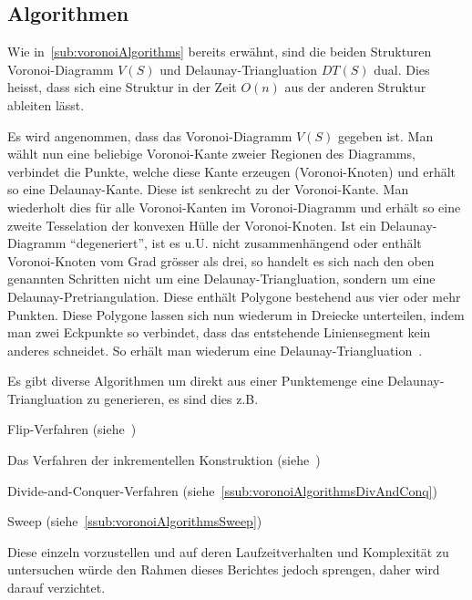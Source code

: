 \subsection{Algorithmen}
\label{sub:delaunayAlgorithms}
Wie in~\ref{sub:voronoiAlgorithms} bereits erwähnt, sind die beiden Strukturen Voronoi-Diagramm $V(S)$ und Delaunay-Triangluation $DT(S)$ dual. Dies heisst, dass sich eine Struktur in der Zeit $O(n)$ aus der anderen Struktur ableiten lässt.

Es wird angenommen, dass das Voronoi-Diagramm $V(S)$ gegeben ist. Man wählt nun eine beliebige Voronoi-Kante zweier Regionen des Diagramms, verbindet die Punkte, welche diese Kante erzeugen (Voronoi-Knoten) und erhält so eine Delaunay-Kante. Diese ist senkrecht zu der Voronoi-Kante. Man wiederholt dies für alle Voronoi-Kanten im Voronoi-Diagramm und erhält so eine zweite Tesselation der konvexen Hülle der Voronoi-Knoten.
Ist ein Delaunay-Diagramm ``degeneriert'', ist es u.U. nicht zusammenhängend oder enthält Voronoi-Knoten vom Grad grösser als drei, so handelt es sich nach den oben genannten Schritten nicht um eine Delaunay-Triangluation, sondern um eine Delaunay-Pretriangulation. Diese enthält Polygone bestehend aus vier oder mehr Punkten. Diese Polygone lassen sich nun wiederum in Dreiecke unterteilen, indem man zwei Eckpunkte so verbindet, dass das entstehende Liniensegment kein anderes schneidet. So erhält man wiederum eine Delaunay-Triangluation~\parencite[S. 52 bis 56]{atsuyuki2000spatialtessellations}.

Es gibt diverse Algorithmen um direkt aus einer Punktemenge eine Delaunay-Triangluation zu generieren, es sind dies z.B.

\begin{compactitem}
\item Flip-Verfahren (siehe~\cite[S. 233 und 444]{atsuyuki2000spatialtessellations})
\item Das Verfahren der inkrementellen Konstruktion (siehe~\cite[S. 272]{klein2005algorithmischegeometrie})
\item Divide-and-Conquer-Verfahren (siehe~\ref{ssub:voronoiAlgorithmsDivAndConq})
\item Sweep (siehe~\ref{ssub:voronoiAlgorithmsSweep})
\end{compactitem}

Diese einzeln vorzustellen und auf deren Laufzeitverhalten und Komplexität zu untersuchen würde den Rahmen dieses Berichtes jedoch sprengen, daher wird darauf verzichtet.
